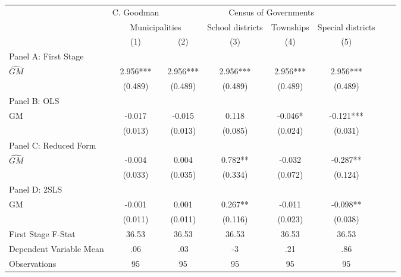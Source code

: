    \begin{tabular}{l*{7}{c}} \toprule
&\multicolumn{1}{c}{C. Goodman}&\multicolumn{4}{c}{Census of Governments}\\\cmidrule(lr){2-2}\cmidrule(lr){3-6}
&\multicolumn{2}{c}{Municipalities}&\multicolumn{1}{c}{School districts}&\multicolumn{1}{c}{Townships}&\multicolumn{1}{c}{Special districts}\\\cmidrule(lr){2-3}\cmidrule(lr){4-6}
&\multicolumn{1}{c}{(1)}&\multicolumn{1}{c}{(2)}&\multicolumn{1}{c}{(3)}&\multicolumn{1}{c}{(4)}&\multicolumn{1}{c}{(5)}\\
\cmidrule(lr){1-6}
\multicolumn{5}{l}{Panel A: First Stage}\\
\cmidrule(lr){1-6}
$\widehat{GM}$  &    2.956***&    2.956***&    2.956***&    2.956***&    2.956***\\
                &  (0.489)   &  (0.489)   &  (0.489)   &  (0.489)   &  (0.489)   \\
\cmidrule(lr){1-6}
\multicolumn{5}{l}{Panel B: OLS}\\
\cmidrule(lr){1-6}
GM              &   -0.017   &   -0.015   &    0.118   &   -0.046*  &   -0.121***\\
                &  (0.013)   &  (0.013)   &  (0.085)   &  (0.024)   &  (0.031)   \\
\cmidrule(lr){1-6}
\multicolumn{5}{l}{Panel C: Reduced Form}\\
\cmidrule(lr){1-6}
$\widehat{GM}$  &   -0.004   &    0.004   &    0.782** &   -0.032   &   -0.287** \\
                &  (0.033)   &  (0.035)   &  (0.334)   &  (0.072)   &  (0.124)   \\
\cmidrule(lr){1-6}
\multicolumn{5}{l}{Panel D: 2SLS}\\
\cmidrule(lr){1-6}
GM              &   -0.001   &    0.001   &    0.267** &   -0.011   &   -0.098** \\
                &  (0.011)   &  (0.011)   &  (0.116)   &  (0.023)   &  (0.038)   \\
\midrule
First Stage F-Stat&    36.53   &    36.53   &    36.53   &    36.53   &    36.53   \\
Dependent Variable Mean&      .06   &      .03   &       -3   &      .21   &      .86   \\
Observations    &       95   &       95   &       95   &       95   &       95   \\
       \bottomrule \end{tabular}

